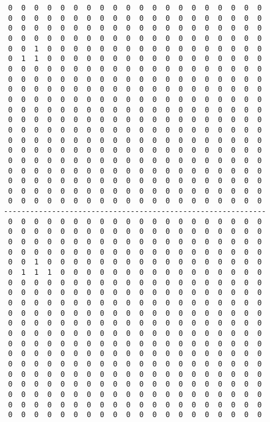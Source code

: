 \pagebreak
\begin{verbatim}
 0  0  0  0  0  0  0  0  0  0  0  0  0  0  0  0  0  0  0  0
 0  0  0  0  0  0  0  0  0  0  0  0  0  0  0  0  0  0  0  0
 0  0  0  0  0  0  0  0  0  0  0  0  0  0  0  0  0  0  0  0
 0  0  0  0  0  0  0  0  0  0  0  0  0  0  0  0  0  0  0  0
 0  0  1  0  0  0  0  0  0  0  0  0  0  0  0  0  0  0  0  0
 0  1  1  0  0  0  0  0  0  0  0  0  0  0  0  0  0  0  0  0
 0  0  0  0  0  0  0  0  0  0  0  0  0  0  0  0  0  0  0  0
 0  0  0  0  0  0  0  0  0  0  0  0  0  0  0  0  0  0  0  0
 0  0  0  0  0  0  0  0  0  0  0  0  0  0  0  0  0  0  0  0
 0  0  0  0  0  0  0  0  0  0  0  0  0  0  0  0  0  0  0  0
 0  0  0  0  0  0  0  0  0  0  0  0  0  0  0  0  0  0  0  0
 0  0  0  0  0  0  0  0  0  0  0  0  0  0  0  0  0  0  0  0
 0  0  0  0  0  0  0  0  0  0  0  0  0  0  0  0  0  0  0  0
 0  0  0  0  0  0  0  0  0  0  0  0  0  0  0  0  0  0  0  0
 0  0  0  0  0  0  0  0  0  0  0  0  0  0  0  0  0  0  0  0
 0  0  0  0  0  0  0  0  0  0  0  0  0  0  0  0  0  0  0  0
 0  0  0  0  0  0  0  0  0  0  0  0  0  0  0  0  0  0  0  0
 0  0  0  0  0  0  0  0  0  0  0  0  0  0  0  0  0  0  0  0
 0  0  0  0  0  0  0  0  0  0  0  0  0  0  0  0  0  0  0  0
 0  0  0  0  0  0  0  0  0  0  0  0  0  0  0  0  0  0  0  0
------------------------------------------------------------
 0  0  0  0  0  0  0  0  0  0  0  0  0  0  0  0  0  0  0  0
 0  0  0  0  0  0  0  0  0  0  0  0  0  0  0  0  0  0  0  0
 0  0  0  0  0  0  0  0  0  0  0  0  0  0  0  0  0  0  0  0
 0  0  0  0  0  0  0  0  0  0  0  0  0  0  0  0  0  0  0  0
 0  0  1  0  0  0  0  0  0  0  0  0  0  0  0  0  0  0  0  0
 0  1  1  1  0  0  0  0  0  0  0  0  0  0  0  0  0  0  0  0
 0  0  0  0  0  0  0  0  0  0  0  0  0  0  0  0  0  0  0  0
 0  0  0  0  0  0  0  0  0  0  0  0  0  0  0  0  0  0  0  0
 0  0  0  0  0  0  0  0  0  0  0  0  0  0  0  0  0  0  0  0
 0  0  0  0  0  0  0  0  0  0  0  0  0  0  0  0  0  0  0  0
 0  0  0  0  0  0  0  0  0  0  0  0  0  0  0  0  0  0  0  0
 0  0  0  0  0  0  0  0  0  0  0  0  0  0  0  0  0  0  0  0
 0  0  0  0  0  0  0  0  0  0  0  0  0  0  0  0  0  0  0  0
 0  0  0  0  0  0  0  0  0  0  0  0  0  0  0  0  0  0  0  0
 0  0  0  0  0  0  0  0  0  0  0  0  0  0  0  0  0  0  0  0
 0  0  0  0  0  0  0  0  0  0  0  0  0  0  0  0  0  0  0  0
 0  0  0  0  0  0  0  0  0  0  0  0  0  0  0  0  0  0  0  0
 0  0  0  0  0  0  0  0  0  0  0  0  0  0  0  0  0  0  0  0
 0  0  0  0  0  0  0  0  0  0  0  0  0  0  0  0  0  0  0  0
 0  0  0  0  0  0  0  0  0  0  0  0  0  0  0  0  0  0  0  0
\end{verbatim}
\pagebreak
